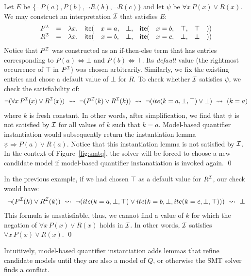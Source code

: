 \documentclass[oribibl]{llncs}
\begin{document}
\begin{example}
Let $E$ be $\{ \neg P( a ), P( b ), \neg R( b ), \neg R( c ) \}$ and let $\psi$ be $\forall x\, P( x ) \vee R( x )$.
We may construct an interpretation $\mathcal{I}$ that satisfies $E$:
\[
\begin{array}{rcccccccccc}
P^{\mathcal{I}} & = & \lambda x. & \mathsf{ite}( & x=a, & \bot, & \mathsf{ite}( & x=b, & \top, & \top  & )) \\
R^{\mathcal{I}} & = & \lambda x. & \mathsf{ite}( & x=b, & \bot, & \mathsf{ite}( & x=c, & \bot, & \bot  & )) \\
\end{array}
\]
Notice that $P^{\mathcal{I}}$ was constructed as an if-then-else term that has entries corresponding to $P( a ) \Leftrightarrow \bot$
and $P( b ) \Leftrightarrow \top$. Its \emph{default} value (the rightmost occurrence of $\top$ in $P^{\mathcal{I}}$) was chosen arbitrarily.
Similarly, we fix the existing entries and chose a default value of $\bot$ for $R$.
To check whether $\mathcal{I}$ satisfies $\psi$, we check the satisfiability of:
\[
\neg ( \forall x\, P^{\mathcal{I}}( x ) \vee R^{\mathcal{I}}( x ) ) \ \leadsto \  \neg ( P^{\mathcal{I}}( k ) \vee R^{\mathcal{I}}( k ) ) \ \leadsto \  \neg ( ite( k=a, \bot, \top) \vee \bot ) \ \leadsto \  ( k = a )
\]
where $k$ is fresh constant.
In other words, after simplification, we find that $\psi$ is not satisfied by $\mathcal{I}$ for all values of $k$ such that $k = a$.
Model-based quantifier instantiation would subsequently return the instantiation lemma $\psi \Rightarrow P( a ) \vee R( a )$.
Notice that this instantiation lemma is not satisfied by $\mathcal{I}$.
In the context of Figure~\ref{fig:smtq}, 
the solver will be forced to choose a new candidate model if model-based quantifier instanatiation is invoked again.
\qed
\end{example}
\begin{example}
In the previous example, if we had chosen $\top$ as a default value for $R^{\mathcal{I}}$, our check would have:
\[
\neg ( P^{\mathcal{I}}( k ) \vee R^{\mathcal{I}}( k ) ) \ \leadsto \  \neg ( ite( k=a, \bot, \top) \vee ite( k=b, \bot, ite( k=c, \bot, \top)) ) \ \leadsto \  \bot
\]
This formula is unsatisfiable, thus, we cannot find a value of $k$ for which the negation of $\forall x\, P( x ) \vee R( x )$ holds in $\mathcal{I}$.
In other words, $\mathcal{I}$ satisfies $\forall x\, P( x ) \vee R( x )$.
\qed
\end{example}
Intuitively,
model-based quantifier instantiation adds lemmas that refine candidate models
until they are also a model of $Q$, or otherwise the SMT solver finds a conflict.
\end{document}
